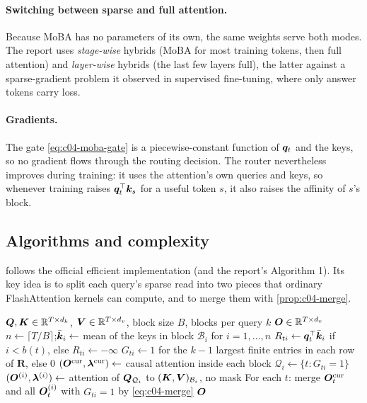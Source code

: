 \paragraph{Switching between sparse and full attention.}
Because MoBA has no parameters of its own, the same weights serve both modes. The report uses
\emph{stage-wise} hybrids (MoBA for most training tokens, then full attention) and
\emph{layer-wise} hybrids (the last few layers full), the latter against a sparse-gradient problem
it observed in supervised fine-tuning, where only answer tokens carry loss.

\paragraph{Gradients.}
The gate \eqref{eq:c04-moba-gate} is a piecewise-constant function of $\bm{q}_t$ and the keys, so
no gradient flows through the routing decision. The router nevertheless improves during
training: it uses the attention's own queries and keys, so whenever training raises
$\bm{q}_t^{\top}\bm{k}_s$ for a useful token $s$, it also raises the affinity of $s$'s block.

\subsection{Algorithms and complexity}

 follows the official efficient implementation (and the report's
Algorithm 1). Its key idea is to split each query's sparse read into two pieces that ordinary
FlashAttention kernels can compute, and to merge them with \cref{prop:c04-merge}.

\begin{algorithm}[t]
\caption{MoBA prefill or training forward pass for one head}\label{alg:c04-moba-prefill}
\begin{algorithmic}[1]
\Require $\bm{Q},\bm{K}\in\mathbb{R}^{T\times d_k}$, $\bm{V}\in\mathbb{R}^{T\times d_v}$, block size $B$, blocks per query $k$
\Ensure $\bm{O}\in\mathbb{R}^{T\times d_v}$
\State $n\gets\lceil T/B\rceil$;\quad $\bar{\bm{k}}_i\gets$ mean of the keys in block $\mathcal{B}_i$ for $i=1,\dots,n$
\State $R_{ti}\gets\bm{q}_t^{\top}\bar{\bm{k}}_i$ if $i<b(t)$, else $R_{ti}\gets-\infty$ 
\State $G_{ti}\gets 1$ for the $k-1$ largest finite entries in each row of $\bm{R}$, else $0$
\State $(\bm{O}^{\mathrm{cur}},\bm{\lambda}^{\mathrm{cur}})\gets$ causal attention inside each block 
  \State $\mathcal{Q}_i\gets\{t: G_{ti}=1\}$ 
  \State $(\bm{O}^{(i)},\bm{\lambda}^{(i)})\gets$ attention of $\bm{Q}_{\mathcal{Q}_i}$ to $(\bm{K},\bm{V})_{\mathcal{B}_i}$, no mask
\EndFor
\State For each $t$: merge $\bm{O}^{\mathrm{cur}}_t$ and all $\bm{O}^{(i)}_t$ with $G_{ti}=1$ by \eqref{eq:c04-merge}
\State \Return $\bm{O}$
\end{algorithmic}
\end{algorithm}

